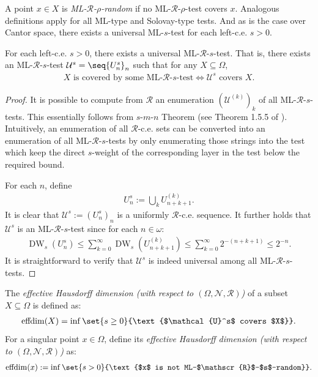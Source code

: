 A point $x \in X$ is \textit{ML-$\mathscr{R}$-$\rho$-random} if no ML-$\mathscr{R}$-$\rho$-test covers $x$. Analogous definitions apply for all ML-type and Solovay-type tests. And as is the case over Cantor space, there exists a universal ML-$s$-test for each left-c.e. $s > 0$.

\begin{proposition}
    For each left-c.e. $s > 0$, there exists a universal ML-$\mathscr{R}$-$s$-test. That is, there exists an ML-$\mathscr{R}$-$s$-test $\mathcal{U}^s = \seq{U^s_n}_n$ such that for any $X \subseteq \Omega$, 
    \begin{align*}
        \text{$X$ is covered by some ML-$\mathscr{R}$-$s$-test} \iff \mathcal{U}^s \text{ covers $X$}.
    \end{align*}
    \label{prop:exists_universal_ML_s_test}
\end{proposition}
\begin{proof}
    It is possible to compute from $\mathscr{R}$ an enumeration $(\mathcal{U}^{(k)})_k$ of all ML-$\mathscr{R}$-$s$-tests. This essentially follows from $s$-$m$-$n$ Theorem (see Theorem 1.5.5 of \cite{Soa16}). Intuitively, an enumeration of all $\mathscr{R}$-c.e. sets can be converted into an enumeration of all ML-$\mathscr{R}$-$s$-tests by only enumerating those strings into the test which keep the direct $s$-weight of the corresponding layer in the test below the required bound. 
    
    For each $n$, define 
    \begin{align*}
        U^s_n := \bigcup_{k} U^{(k)}_{n + k + 1}.
    \end{align*}
    It is clear that $\mathcal{U}^s := (U^s_n)_n$ is a uniformly $\mathscr{R}$-c.e. sequence. It further holds that $\mathcal{U}^s$ is an ML-$\mathscr{R}$-$s$-test since for each $n \in \omega$:
    \begin{align*}
        \operatorname{DW}_s(U^s_n) \leq \sum_{k = 0}^\infty \operatorname{DW}_s(U^{(k)}_{n + k + 1}) \leq \sum_{k = 0}^\infty 2^{-(n + k + 1)} \leq 2^{-n}.
    \end{align*}
    It is straightforward to verify that $\mathcal{U}^s$ is indeed universal among all ML-$\mathscr{R}$-$s$-tests.  
\end{proof}

\begin{definition}
    The \textit{effective Hausdorff dimension (with respect to $(\Omega, \mathcal{N}, \mathscr{R})$)} of a subset $X \subseteq \Omega$ is defined as:
    \begin{align*}
        \operatorname{effdim}(X) = \inf \set{s \geq 0}{\text{$\mathcal{U}^s$ covers $X$}}.
    \end{align*}
    For a singular point $x \in \Omega$, define its \textit{effective Hausdorff dimension (with respect to $(\Omega, \mathcal{N}, \mathscr{R})$)} as:
    \begin{align*}
        \operatorname{effdim}(x) := \inf \set{s > 0}{\text{$x$ is not ML-$\mathscr{R}$-$s$-random}}.
    \end{align*}
\end{definition}

